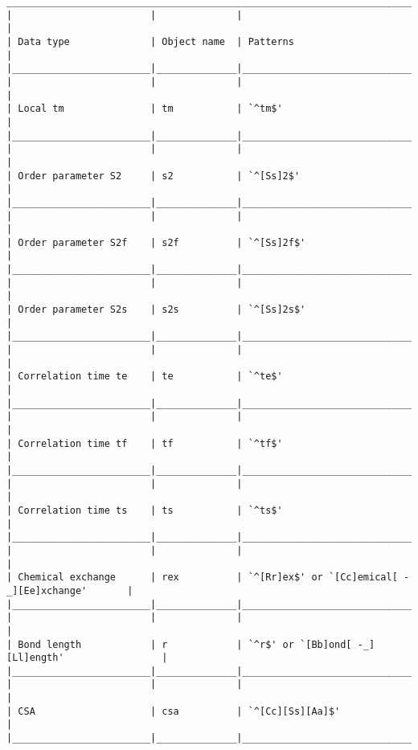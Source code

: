 {\begin{verbatim}
____________________________________________________________________________________________
|                        |              |                                                  |
| Data type              | Object name  | Patterns                                         |
|________________________|______________|__________________________________________________|
|                        |              |                                                  |
| Local tm               | tm           | `^tm$'                                           |
|________________________|______________|__________________________________________________|
|                        |              |                                                  |
| Order parameter S2     | s2           | `^[Ss]2$'                                        |
|________________________|______________|__________________________________________________|
|                        |              |                                                  |
| Order parameter S2f    | s2f          | `^[Ss]2f$'                                       |
|________________________|______________|__________________________________________________|
|                        |              |                                                  |
| Order parameter S2s    | s2s          | `^[Ss]2s$'                                       |
|________________________|______________|__________________________________________________|
|                        |              |                                                  |
| Correlation time te    | te           | `^te$'                                           |
|________________________|______________|__________________________________________________|
|                        |              |                                                  |
| Correlation time tf    | tf           | `^tf$'                                           |
|________________________|______________|__________________________________________________|
|                        |              |                                                  |
| Correlation time ts    | ts           | `^ts$'                                           |
|________________________|______________|__________________________________________________|
|                        |              |                                                  |
| Chemical exchange      | rex          | `^[Rr]ex$' or `[Cc]emical[ -_][Ee]xchange'       |
|________________________|______________|__________________________________________________|
|                        |              |                                                  |
| Bond length            | r            | `^r$' or `[Bb]ond[ -_][Ll]ength'                 |
|________________________|______________|__________________________________________________|
|                        |              |                                                  |
| CSA                    | csa          | `^[Cc][Ss][Aa]$'                                 |
|________________________|______________|__________________________________________________|





\end{verbatim}}
